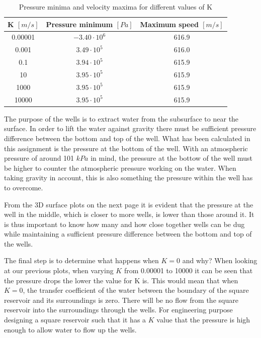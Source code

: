 \documentclass[a4paper]{report}
\begin{document}
\begin{table}[h]
	\caption{Pressure minima and velocity maxima for different values of K} %
	\centering %
	\begin{tabular}{c c c} %
		\hline\hline %
		K $[m/s]$ & Pressure minimum $[Pa]$ & Maximum speed $[m/s]$\\ [0.5ex] %
		\hline %
		0.00001 & $-3.40 \cdot 10^6$ & 616.9\\ %
		0.001 & $3.49 \cdot 10^5$ & 616.0\\
		0.1& $3.94 \cdot 10^5$ & 615.9\\
		10 & $3.95 \cdot 10^{5}$ & 615.9\\
		1000 & $3.95  \cdot 10^5$ & 615.9\\
		10000 & $3.95 \cdot 10^5$ & 615.9\\ [1ex] %
		\hline %
	\end{tabular}
	\label{table:nonlin} %
\end{table}

The purpose of the wells is to extract water from the subsurface to near the surface. In order to lift the water against gravity there must be sufficient pressure difference between the bottom and top of the well. What has been calculated in this assignment is the pressure at the bottom of the well. With an atmospheric pressure of around 101 $kPa$ in mind, the pressure at the bottow of the well must be higher to counter the atmospheric pressure working on the water. When taking gravity in account, this is also something the pressure within the well has to overcome. 

From the 3D surface plots on the next page it is evident that the pressure at the well in the middle, which is closer to more wells, is lower than those around it. It is thus important to know how many and how close together wells can be dug while maintaining a sufficient pressure difference between the bottom and top of the wells.

The final step is to determine what happens when $K=0$ and why? When looking at our previous plots, when varying $K$ from 0.00001 to 10000 it can be seen that the pressure drops the lower the value for K is. This would mean that when $K=0$, the transfer coefficient of the water between the boundary of the square reservoir and its surroundings is zero. There will be no flow from the square reservoir into the surroundings through the wells. For engineering purpose designing a square reservoir
such that it has a $K$ value that the pressure is high enough to allow water to flow up the wells.
\end{document}
